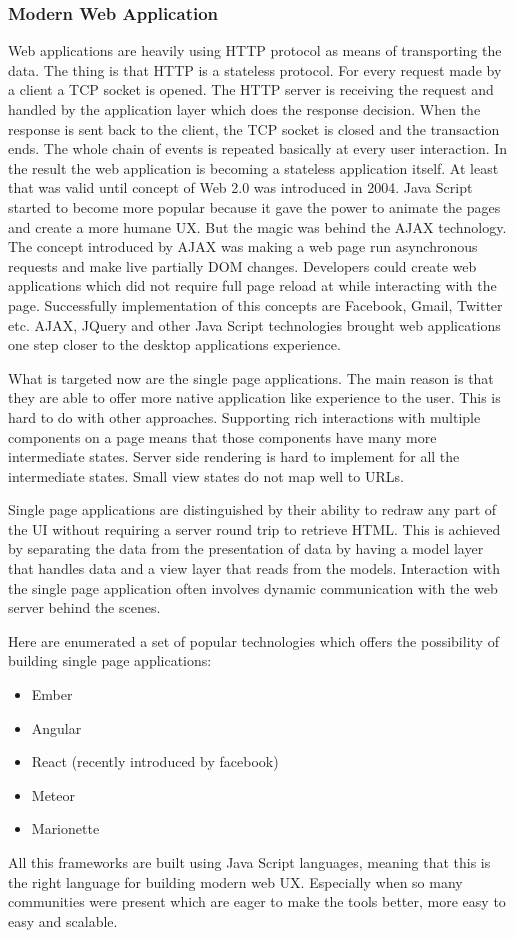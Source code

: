 \subsubsection{Modern Web Application}
Web applications are heavily using HTTP protocol as means of transporting the data. The thing is that HTTP is a stateless protocol. For every request made by a client a TCP socket is opened. The HTTP server is receiving the request and handled by the application layer which does the response decision. When the response is sent back to the client, the TCP socket is closed and the transaction ends. The whole chain of events is repeated basically at every user interaction. In the result the web application is becoming a stateless application itself. At least that was valid until concept of Web 2.0 was introduced in 2004. Java Script started to become more popular because it gave the power to animate the pages and create a more humane UX. But the magic was behind the AJAX technology. The concept introduced by AJAX was making a web page run asynchronous requests and make live partially DOM changes. Developers could create web applications which did not require full page reload at while interacting with the page. Successfully implementation of this concepts are Facebook, Gmail, Twitter etc. AJAX, JQuery and other Java Script technologies brought web applications one step closer to the desktop applications experience.

What is targeted now are the single page applications. The main reason is that they are able to offer more native application like experience to the user. This is hard to do with other approaches. Supporting rich interactions with multiple components on a page means that those components have many more intermediate states. Server side rendering is hard to implement for all the intermediate states. Small view states do not map well to URLs.

Single page applications are distinguished by their ability to redraw any part of the UI without requiring a server round trip to retrieve HTML. This is achieved by separating the data from the presentation of data by having a model layer that handles data and a view layer that reads from the models. Interaction with the single page application often involves dynamic communication with the web server behind the scenes.

Here are enumerated a set of popular technologies which offers the possibility of building single page applications:
\begin{itemize}
    \item Ember
    \item Angular
    \item React (recently introduced by facebook)
    \item Meteor
    \item Marionette
\end{itemize}
All this frameworks are built using Java Script languages, meaning that this is the right language for building modern web UX. Especially when so many communities were present which are eager to make the tools better, more easy to easy and scalable.

